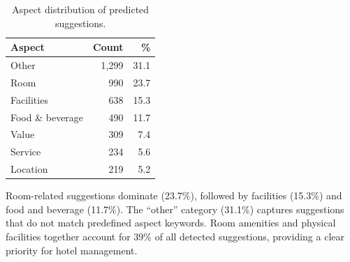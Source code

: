 \begin{table}[t]
\centering\small
\caption{Aspect distribution of predicted suggestions.}
\label{tab:aspects}
\begin{tabular}{lrr}
\toprule
\textbf{Aspect} & \textbf{Count} & \textbf{\%} \\
\midrule
Other            & 1,299 & 31.1 \\
Room             &   990 & 23.7 \\
Facilities       &   638 & 15.3 \\
Food \& beverage &   490 & 11.7 \\
Value            &   309 &  7.4 \\
Service          &   234 &  5.6 \\
Location         &   219 &  5.2 \\
\bottomrule
\end{tabular}
\end{table}

Room-related suggestions dominate (23.7\%), followed by
facilities (15.3\%) and food and beverage (11.7\%). The ``other''
category (31.1\%) captures suggestions that do not match
predefined aspect keywords. Room amenities and physical
facilities together account for 39\% of all detected
suggestions, providing a clear priority for hotel management.
